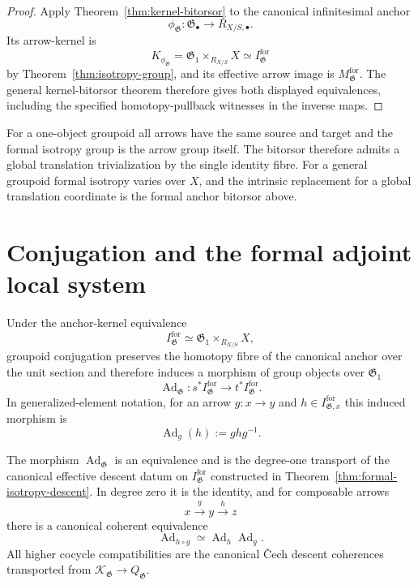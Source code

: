 \begin{proof}
Apply Theorem~\ref{thm:kernel-bitorsor} to the canonical infinitesimal anchor
\[
    \phi_{\mathfrak G}:
    \mathfrak G_\bullet
    \longrightarrow
    R_{X/S,\bullet}.
\]
Its arrow-kernel is
\[
    K_{\phi_{\mathfrak G}}
    =
    \mathfrak G_1\times_{R_{X/S}}X
    \simeq
    I^{\mathrm{for}}_{\mathfrak G}
\]
by Theorem~\ref{thm:isotropy-group}, and its effective arrow image is
$M^{\mathrm{for}}_{\mathfrak G}$.  The general kernel-bitorsor theorem
therefore gives both displayed equivalences, including the specified
homotopy-pullback witnesses in the inverse maps.
\end{proof}

\begin{remark}
\label{rem:group-case-exceptional}
For a one-object groupoid all arrows have the same source and target and the
formal isotropy group is the arrow group itself.  The bitorsor therefore
admits a global translation trivialization by the single identity fibre.
For a general groupoid formal isotropy varies over $X$, and the intrinsic
replacement for a global translation coordinate is the formal anchor
bitorsor above.
\end{remark}


\section{Conjugation and the formal adjoint local system}
\label{sec:flg-adjoint}

\begin{definition}
\label{def:formal-adjoint-transport}
Under the anchor-kernel equivalence
\[
    I^{\mathrm{for}}_{\mathfrak G}
    \simeq
    \mathfrak G_1\times_{R_{X/S}}X,
\]
groupoid conjugation preserves the homotopy fibre of the canonical anchor over
the unit section and therefore induces a morphism of group objects over
$\mathfrak G_1$
\[
    \operatorname{Ad}_{\mathfrak G}:
    s^*I^{\mathrm{for}}_{\mathfrak G}
    \longrightarrow
    t^*I^{\mathrm{for}}_{\mathfrak G}.
\]
In generalized-element notation, for an arrow $g:x\to y$ and
$h\in I^{\mathrm{for}}_{\mathfrak G,x}$ this induced morphism is
\[
    \operatorname{Ad}_g(h)
    :=
    g h g^{-1}.
\]
\end{definition}

\begin{theorem}
\label{thm:coherent-adjoint-transport}
The morphism
$\operatorname{Ad}_{\mathfrak G}$ is an equivalence and is the degree-one
transport of the canonical effective descent datum on
$I^{\mathrm{for}}_{\mathfrak G}$ constructed in
Theorem~\ref{thm:formal-isotropy-descent}.  In degree zero it is the identity,
and for composable arrows
\[
    x\xrightarrow{g}y\xrightarrow{h}z
\]
there is a canonical coherent equivalence
\[
    \operatorname{Ad}_{h\circ g}
    \simeq
    \operatorname{Ad}_h\operatorname{Ad}_g.
\]
All higher cocycle compatibilities are the canonical \v{C}ech descent
coherences transported from
$\mathcal K_{\mathfrak G}\to Q_{\mathfrak G}$.
\end{theorem}


